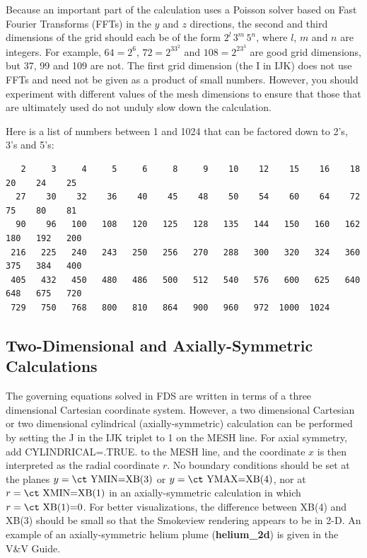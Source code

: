 \documentclass[11pt]{book}
\begin{document}
\noindent
Because an important part of the calculation uses a Poisson solver based on
Fast Fourier Transforms (FFTs) in the $y$ and $z$ directions, the second and third dimensions
of the grid should each be of the form $2^l \, 3^m \, 5^n$, where
$l$, $m$ and $n$ are integers. For example,
$64=2^6$, $72=2^33^2$ and $108=2^23^3$ are good grid dimensions, but 37, 99 and 109 are not.
The first grid dimension (the {\ct I} in {\ct IJK})  does not use FFTs and need not be given as a
product of small numbers. However, you should experiment with different values of the mesh
dimensions to ensure that those that are ultimately used do not unduly slow down the calculation.

Here is a list of numbers between 1 and 1024 that can be factored
down to 2's, 3's and 5's:

\footnotesize
\begin{verbatim}
   2     3     4     5     6     8     9    10    12    15    16    18    20    24    25
  27    30    32    36    40    45    48    50    54    60    64    72    75    80    81
  90    96   100   108   120   125   128   135   144   150   160   162   180   192   200
 216   225   240   243   250   256   270   288   300   320   324   360   375   384   400
 405   432   450   480   486   500   512   540   576   600   625   640   648   675   720
 729   750   768   800   810   864   900   960   972  1000  1024
\end{verbatim}
\normalsize


\subsection{Two-Dimensional and Axially-Symmetric Calculations}
\label{info:2D}

The governing equations solved in FDS are written in terms of a
three dimensional Cartesian coordinate system. However,
a two dimensional Cartesian or two dimensional cylindrical
(axially-symmetric) calculation can be performed by setting the {\ct J} in the {\ct IJK} triplet
to 1 on the {\ct MESH} line. For axial symmetry, add {\ct CYLINDRICAL=.TRUE.} to the
{\ct MESH} line, and the coordinate $x$ is then interpreted as the radial coordinate $r$.
No boundary conditions should be set at the planes $y=\hbox{\ct YMIN=XB(3)}$ or
$y=\hbox{\ct YMAX=XB(4)}$, nor at $r=\hbox{\ct XMIN=XB(1)}$ in an axially-symmetric
calculation in which $r=\hbox{\ct XB(1)=0}$. For better visualizations, the difference between
{\ct XB(4)} and {\ct XB(3)} should be small so that the Smokeview rendering appears to be in 2-D.
An example of an axially-symmetric helium plume ({\bf helium\_2d}) is given in the V\&V Guide.
\end{document}
